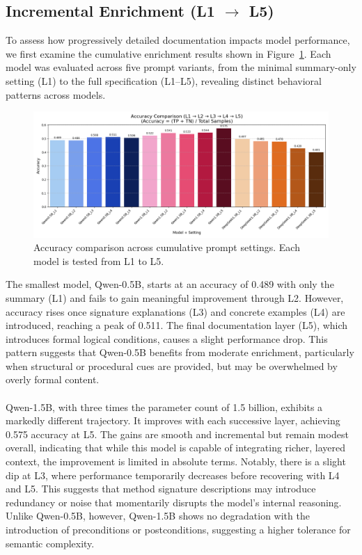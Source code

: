\documentclass[a4paper]{usiinfbachelorproject}
\begin{document}
\subsection{Incremental Enrichment (L1 $\rightarrow$ L5)}

To assess how progressively detailed documentation impacts model performance, we first examine the cumulative enrichment results shown in Figure~\ref{fig:acc-l1-l5}. Each model was evaluated across five prompt variants, from the minimal summary-only setting (L1) to the full specification (L1–L5), revealing distinct behavioral patterns across models.
\begin{figure}[H]\centering
  \includegraphics[width=0.95\linewidth]{figures/accuracy_comparison.png}
  \caption{Accuracy comparison across cumulative prompt settings. Each model is tested from L1 to L5.}
  \label{fig:acc-l1-l5}
\end{figure}
\noindent
The smallest model, Qwen-0.5B, starts at an accuracy of 0.489 with only the summary (L1) and fails to gain meaningful improvement through L2. However, accuracy rises once signature explanations (L3) and concrete examples (L4) are introduced, reaching a peak of 0.511. The final documentation layer (L5), which introduces formal logical conditions, causes a slight performance drop. This pattern suggests that Qwen-0.5B benefits from moderate enrichment, particularly when structural or procedural cues are provided, but may be overwhelmed by overly formal content. \\
\\
Qwen-1.5B, with three times the parameter count of 1.5 billion, exhibits a markedly different trajectory. It improves with each successive layer, achieving 0.575 accuracy at L5. The gains are smooth and incremental but remain modest overall, indicating that while this model is capable of integrating richer, layered context, the improvement is limited in absolute terms. Notably, there is a slight dip at L3, where performance temporarily decreases before recovering with L4 and L5. This suggests that method signature descriptions may introduce redundancy or noise that momentarily disrupts the model’s internal reasoning. Unlike Qwen-0.5B, however, Qwen-1.5B shows no degradation with the introduction of preconditions or postconditions, suggesting a higher tolerance for semantic complexity. \\
\end{document}
